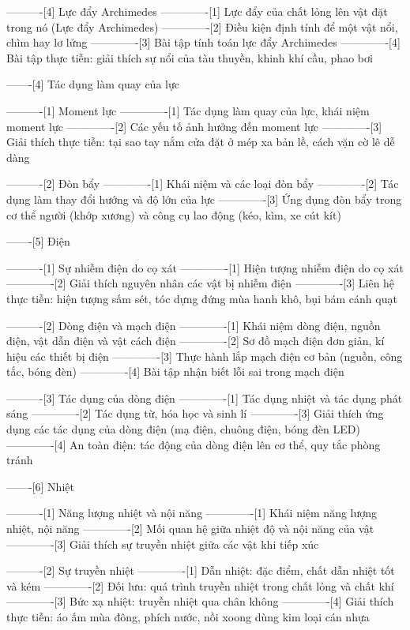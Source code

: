 ----------[4] Lực đẩy Archimedes
-------------[1] Lực đẩy của chất lỏng lên vật đặt trong nó (Lực đẩy Archimedes)
-------------[2] Điều kiện định tính để một vật nổi, chìm hay lơ lửng
-------------[3] Bài tập tính toán lực đẩy Archimedes
-------------[4] Bài tập thực tiễn: giải thích sự nổi của tàu thuyền, khinh khí cầu, phao bơi

-------[4] Tác dụng làm quay của lực

----------[1] Moment lực
-------------[1] Tác dụng làm quay của lực, khái niệm moment lực
-------------[2] Các yếu tố ảnh hưởng đến moment lực
-------------[3] Giải thích thực tiễn: tại sao tay nắm cửa đặt ở mép xa bản lề, cách vặn cờ lê dễ dàng

----------[2] Đòn bẩy
-------------[1] Khái niệm và các loại đòn bẩy
-------------[2] Tác dụng làm thay đổi hướng và độ lớn của lực
-------------[3] Ứng dụng đòn bẩy trong cơ thể người (khớp xương) và công cụ lao động (kéo, kìm, xe cút kít)

-------[5] Điện

----------[1] Sự nhiễm điện do cọ xát
-------------[1] Hiện tượng nhiễm điện do cọ xát
-------------[2] Giải thích nguyên nhân các vật bị nhiễm điện
-------------[3] Liên hệ thực tiễn: hiện tượng sấm sét, tóc dựng đứng mùa hanh khô, bụi bám cánh quạt

----------[2] Dòng điện và mạch điện
-------------[1] Khái niệm dòng điện, nguồn điện, vật dẫn điện và vật cách điện
-------------[2] Sơ đồ mạch điện đơn giản, kí hiệu các thiết bị điện
-------------[3] Thực hành lắp mạch điện cơ bản (nguồn, công tắc, bóng đèn)
-------------[4] Bài tập nhận biết lỗi sai trong mạch điện

----------[3] Tác dụng của dòng điện
-------------[1] Tác dụng nhiệt và tác dụng phát sáng
-------------[2] Tác dụng từ, hóa học và sinh lí
-------------[3] Giải thích ứng dụng các tác dụng của dòng điện (mạ điện, chuông điện, bóng đèn LED)
-------------[4] An toàn điện: tác động của dòng điện lên cơ thể, quy tắc phòng tránh

-------[6] Nhiệt

----------[1] Năng lượng nhiệt và nội năng
-------------[1] Khái niệm năng lượng nhiệt, nội năng
-------------[2] Mối quan hệ giữa nhiệt độ và nội năng của vật
-------------[3] Giải thích sự truyền nhiệt giữa các vật khi tiếp xúc

----------[2] Sự truyền nhiệt
-------------[1] Dẫn nhiệt: đặc điểm, chất dẫn nhiệt tốt và kém
-------------[2] Đối lưu: quá trình truyền nhiệt trong chất lỏng và chất khí
-------------[3] Bức xạ nhiệt: truyền nhiệt qua chân không
-------------[4] Giải thích thực tiễn: áo ấm mùa đông, phích nước, nồi xoong dùng kim loại cán nhựa

